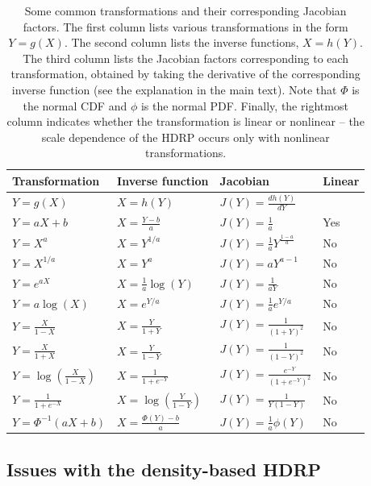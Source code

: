 \documentclass[man]{apa}
\newcommand{\hdr}{HDRP}
\begin{document}
\begin{table}[tb]
\centering 
\caption{Some common transformations and their corresponding Jacobian factors. The first column lists various transformations in the form $Y=g(X)$. The second column lists the inverse functions, $X=h(Y)$. The third column lists the Jacobian factors corresponding to each transformation, obtained by taking the derivative of the corresponding inverse function (see the explanation in the main text). Note that $\Phi$ is the normal CDF and $\phi$ is the normal PDF. Finally, the rightmost column indicates whether the transformation is linear or nonlinear -- the scale dependence of the \hdr{} occurs only with nonlinear transformations.}
\label{tab:transformations}
\begin{tabular}{llll}\hline
Transformation & Inverse function & Jacobian & Linear  \\ \hline
$Y = g(X)$ & $X = h(Y)$ & $J(Y) =\frac{dh(Y)}{dY}$ &  \\\hline
$Y=aX +b$  & $X= \frac{Y-b}{a}$ & $J(Y)=\frac{1}{a}$ & Yes \\
$Y= X^a$   & $X = Y^{1/a}$      & $J(Y)=\frac{1}{a} Y^{\frac{1-a}{a}}$ & No \\
$Y= X^{1/a}$ & $X = Y^{a}$ & $J(Y)=a Y^{a-1}$ & No \\
$Y = e^{aX}$ & $X = \frac{1}{a}\log(Y)$ & $J(Y)=\frac{1}{aY}$& No \\
$Y = a\log(X)$  & $X = e^{Y/a}$ & $J(Y)=\frac{1}{a}e^{Y/a}$& No \\
$Y = \frac{X}{1-X}$ & $X = \frac{Y}{1+Y}$  & $J(Y)=\frac{1}{(1+Y)^2}$ & No\\
$Y = \frac{X}{1+X}$ & $X = \frac{Y}{1-Y}$ & $J(Y)=\frac{1}{(1-Y)^2}$& No\\
$Y = \log\left(\frac{X}{1-X}\right)$ & $X = \frac{1}{1+e^{-Y}}$ & $J(Y)=\frac{e^{-Y}}{\left(1+e^{-Y}\right)^2}$& No \\
$Y = \frac{1}{1+e^{-X}}$ & $X = \log\left(\frac{Y}{1-Y}\right)$ & $J(Y)=\frac{1}{Y(1-Y)}$& No\\
$Y = \Phi^{-1}(aX+b)$ & $X = \frac{\Phi(Y)-b}{a}$  & $J(Y)=\frac{1}{a}\phi(Y)$& No\\[.5ex]\hline
\end{tabular}
\end{table}

\subsection*{Issues with the density-based \hdr{}}
\end{document}
